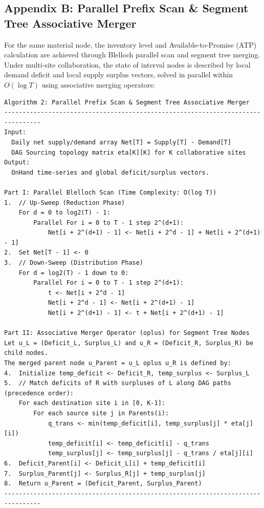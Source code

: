 \documentclass{article}
\begin{document}
\subsection*{Appendix B: Parallel Prefix Scan \& Segment Tree Associative Merger}

For the same material node, the inventory level and Available-to-Promise (ATP) calculation are achieved through Blelloch parallel scan and segment tree merging. Under multi-site collaboration, the state of interval nodes is described by local demand deficit and local supply surplus vectors, solved in parallel within $O(\log T)$ using associative merging operators:

\begin{verbatim}
Algorithm 2: Parallel Prefix Scan & Segment Tree Associative Merger
--------------------------------------------------------------------------------
Input:
  Daily net supply/demand array Net[T] = Supply[T] - Demand[T]
  DAG Sourcing topology matrix eta[K][K] for K collaborative sites
Output:
  OnHand time-series and global deficit/surplus vectors.

Part I: Parallel Blelloch Scan (Time Complexity: O(log T))
1.  // Up-Sweep (Reduction Phase)
    For d = 0 to log2(T) - 1:
        Parallel For i = 0 to T - 1 step 2^(d+1):
            Net[i + 2^(d+1) - 1] <- Net[i + 2^d - 1] + Net[i + 2^(d+1) - 1]
2.  Set Net[T - 1] <- 0
3.  // Down-Sweep (Distribution Phase)
    For d = log2(T) - 1 down to 0:
        Parallel For i = 0 to T - 1 step 2^(d+1):
            t <- Net[i + 2^d - 1]
            Net[i + 2^d - 1] <- Net[i + 2^(d+1) - 1]
            Net[i + 2^(d+1) - 1] <- t + Net[i + 2^(d+1) - 1]

Part II: Associative Merger Operator (oplus) for Segment Tree Nodes
Let u_L = (Deficit_L, Surplus_L) and u_R = (Deficit_R, Surplus_R) be child nodes.
The merged parent node u_Parent = u_L oplus u_R is defined by:
4.  Initialize temp_deficit <- Deficit_R, temp_surplus <- Surplus_L
5.  // Match deficits of R with surpluses of L along DAG paths (precedence order):
    For each destination site i in [0, K-1]:
        For each source site j in Parents(i):
            q_trans <- min(temp_deficit[i], temp_surplus[j] * eta[j][i])
            temp_deficit[i] <- temp_deficit[i] - q_trans
            temp_surplus[j] <- temp_surplus[j] - q_trans / eta[j][i]
6.  Deficit_Parent[i] <- Deficit_L[i] + temp_deficit[i]
7.  Surplus_Parent[j] <- Surplus_R[j] + temp_surplus[j]
8.  Return u_Parent = (Deficit_Parent, Surplus_Parent)
--------------------------------------------------------------------------------
\end{verbatim}
\end{document}
